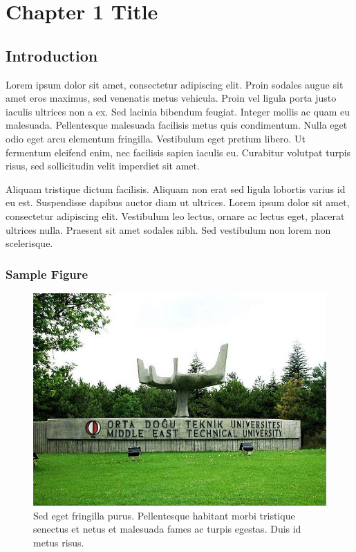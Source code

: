 \chapter{Chapter 1 Title}
\label{chp:b2}

\section{Introduction}
Lorem ipsum dolor sit amet, consectetur adipiscing elit. Proin sodales augue sit amet eros maximus, sed venenatis metus vehicula. Proin vel ligula porta justo iaculis ultrices non a ex. Sed lacinia bibendum feugiat. Integer mollis ac quam eu malesuada. Pellentesque malesuada facilisis metus quis condimentum. Nulla eget odio eget arcu elementum fringilla. Vestibulum eget pretium libero. Ut fermentum eleifend enim, nec facilisis sapien iaculis eu. Curabitur volutpat turpis risus, sed sollicitudin velit imperdiet sit amet.

Aliquam tristique dictum facilisis. Aliquam non erat sed ligula lobortis varius id eu est. Suspendisse dapibus auctor diam ut ultrices. Lorem ipsum dolor sit amet, consectetur adipiscing elit. Vestibulum leo lectus, ornare ac lectus eget, placerat ultrices nulla. Praesent sit amet sodales nibh. Sed vestibulum non lorem non scelerisque. 

\subsection{Sample Figure}

\begin{figure}[h]
\centering
\includegraphics[width=.8\textwidth]{figures/bilim_agaci.jpg}
\caption{Sed eget fringilla purus. Pellentesque habitant morbi tristique senectus et netus et malesuada fames ac turpis egestas. Duis id metus risus. }
\label{fig:sample}
\end{figure}

